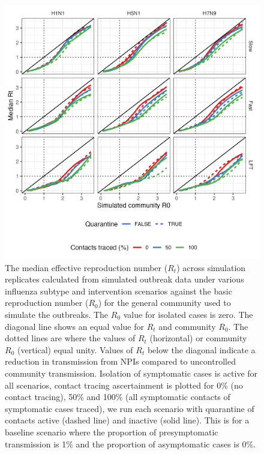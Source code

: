 \documentclass{article}
\begin{document}
\begin{figure}[ht]
\centering
\includegraphics[width=\textwidth]{../plots/r0_high_presym_asym.png}
\caption{The median effective reproduction number ($R_t$) across simulation replicates calculated from simulated outbreak data under various influenza subtype and intervention scenarios against the basic reproduction number ($R_0$) for the general community used to simulate the outbreaks. The $R_0$ value for isolated cases is zero. The diagonal line shows an equal value for $R_t$ and community $R_0$. The dotted lines are where the values of $R_t$ (horizontal) or community $R_0$ (vertical) equal unity. Values of $R_t$ below the diagonal indicate a reduction in transmission from NPIs compared to uncontrolled community transmission. Isolation of symptomatic cases is active for all scenarios, contact tracing ascertainment is plotted for 0\% (no contact tracing), 50\% and 100\% (all symptomatic contacts of symptomatic cases traced), we run each scenario with quarantine of contacts active (dashed line) and inactive (solid line). This is for a baseline scenario where the proportion of presymptomatic transmission is 1\% and the proportion of asymptomatic cases is 0\%.}
\label{fig:r0_high_presym_asym}
\end{figure}
\end{document}
